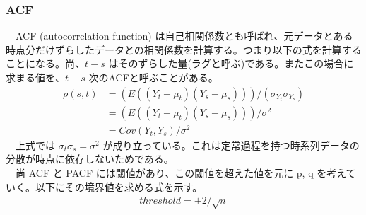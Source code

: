 \documentclass[dvipdfmx]{scrartcl}
\begin{document}
\subsubsection{ACF}
\label{sec:org4681576}
　ACF (autocorrelation function) は自己相関係数とも呼ばれ、元データとある時点分だけずらしたデータとの相関係数を計算する。つまり以下の式を計算することになる。尚、\(t-s\) はそのずらした量(ラグと呼ぶ)である。またこの場合に求まる値を、\(t-s\) 次のACFと呼ぶことがある。\\
\begin{align}
\rho(s,t) &= (E((Y_t - \mu_t)(Y_s-\mu_s)))/(\sigma_{Y_t}\sigma_{Y_s}) \nonumber \\
&= (E((Y_t - \mu_t)(Y_s-\mu_s)))/\sigma^2 \nonumber \\
&= Cov(Y_t, Y_s)/\sigma^2
\end{align}
　上式では \(\sigma_t\sigma_s = \sigma^2\) が成り立っている。これは定常過程を持つ時系列データの分散が時点に依存しないためである。\\
　尚 ACF と PACF には閾値があり、この閾値を超えた値を元に p, q を考えていく。以下にその境界値を求める式を示す。\\
\begin{align}
threshold = \pm 2/\sqrt{n}
\end{align}
\end{document}
